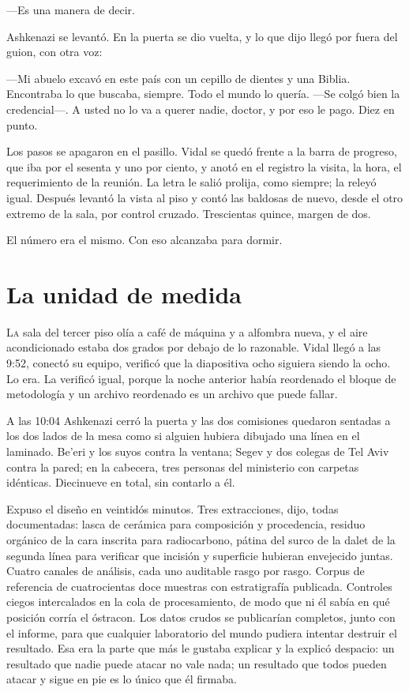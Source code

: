 ---Es una manera de decir.

Ashkenazi se levantó. En la puerta se dio vuelta, y lo que dijo llegó por fuera del guion, con otra voz:

---Mi abuelo excavó en este país con un cepillo de dientes y una Biblia. Encontraba lo que buscaba, siempre. Todo el mundo lo quería. ---Se colgó bien la credencial---. A usted no lo va a querer nadie, doctor, y por eso le pago. Diez en punto.

Los pasos se apagaron en el pasillo. Vidal se quedó frente a la barra de progreso, que iba por el sesenta y uno por ciento, y anotó en el registro la visita, la hora, el requerimiento de la reunión. La letra le salió prolija, como siempre; la releyó igual. Después levantó la vista al piso y contó las baldosas de nuevo, desde el otro extremo de la sala, por control cruzado. Trescientas quince, margen de dos.

El número era el mismo. Con eso alcanzaba para dormir.

\clearpage

\chapter{La unidad de medida}

\lettrine[lines=2, lhang=0.1, nindent=0.2em]{L}{a} sala del tercer piso olía a café de máquina y a alfombra nueva, y el aire acondicionado estaba dos grados por debajo de lo razonable. Vidal llegó a las 9:52, conectó su equipo, verificó que la diapositiva ocho siguiera siendo la ocho. Lo era. La verificó igual, porque la noche anterior había reordenado el bloque de metodología y un archivo reordenado es un archivo que puede fallar.


A las 10:04 Ashkenazi cerró la puerta y las dos comisiones quedaron sentadas a los dos lados de la mesa como si alguien hubiera dibujado una línea en el laminado. Be'eri y los suyos contra la ventana; Segev y dos colegas de Tel Aviv contra la pared; en la cabecera, tres personas del ministerio con carpetas idénticas. Diecinueve en total, sin contarlo a él.

Expuso el diseño en veintidós minutos. Tres extracciones, dijo, todas documentadas: lasca de cerámica para composición y procedencia, residuo orgánico de la cara inscrita para radiocarbono, pátina del surco de la dalet de la segunda línea para verificar que incisión y superficie hubieran envejecido juntas. Cuatro canales de análisis, cada uno auditable rasgo por rasgo. Corpus de referencia de cuatrocientas doce muestras con estratigrafía publicada. Controles ciegos intercalados en la cola de procesamiento, de modo que ni él sabía en qué posición corría el óstracon. Los datos crudos se publicarían completos, junto con el informe, para que cualquier laboratorio del mundo pudiera intentar destruir el resultado. Esa era la parte que más le gustaba explicar y la explicó despacio: un resultado que nadie puede atacar no vale nada; un resultado que todos pueden atacar y sigue en pie es lo único que él firmaba.


